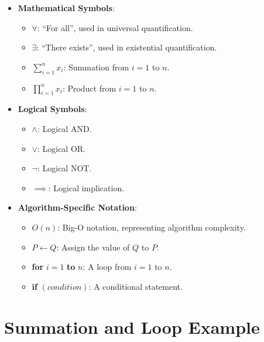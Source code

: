\documentclass[
  letterpaper,
  DIV=11,
  numbers=noendperiod]{scrreprt}
\providecommand{\tightlist}{%
  \setlength{\itemsep}{0pt}\setlength{\parskip}{0pt}}\usepackage{longtable,booktabs,array}
\begin{document}
\begin{itemize}
\tightlist
\item
  \textbf{Mathematical Symbols}:

  \begin{itemize}
  \tightlist
  \item
    \(\forall\): ``For all'', used in universal quantification.
  \item
    \(\exists\): ``There exists'', used in existential quantification.
  \item
    \(\sum_{i=1}^n x_i\): Summation from \(i = 1\) to \(n\).
  \item
    \(\prod_{i=1}^n x_i\): Product from \(i = 1\) to \(n\).
  \end{itemize}
\item
  \textbf{Logical Symbols}:

  \begin{itemize}
  \tightlist
  \item
    \(\land\): Logical AND.
  \item
    \(\lor\): Logical OR.
  \item
    \(\neg\): Logical NOT.
  \item
    \(\implies\): Logical implication.
  \end{itemize}
\item
  \textbf{Algorithm-Specific Notation}:

  \begin{itemize}
  \tightlist
  \item
    \(O(n)\): Big-O notation, representing algorithm complexity.
  \item
    \(P \leftarrow Q\): Assign the value of \(Q\) to \(P\).
  \item
    \textbf{for} \(i = 1\) \textbf{to} \(n\): A loop from \(i = 1\) to
    \(n\).
  \item
    \textbf{if} \((condition)\): A conditional statement.
  \end{itemize}
\end{itemize}

\section{Summation and Loop Example}\label{summation-and-loop-example}
\end{document}

